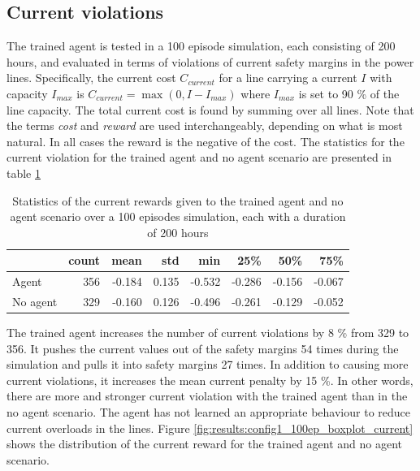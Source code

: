 \documentclass[class=book, crop=false]{standalone}
\begin{document}
\subsection{Current violations}
The trained agent is tested in a 100 episode simulation, each consisting of 200 hours, and evaluated in terms of violations of current safety margins in the power lines. Specifically, the current cost $C_{current}$ for a line carrying a current $I$ with capacity $I_{max}$ is $C_{current} = \max(0,I - I_{max})$ where $I_{max}$ is set to 90 \% of the line capacity. The total current cost is found by summing over all lines. Note that the terms \textit{cost} and \textit{reward} are used interchangeably, depending on what is most natural. In all cases the reward is the negative of the cost. The statistics for the current violation for the trained agent and no agent scenario are presented in table \ref{table:results:configuration1_reward_100_episodes_current}

\begin{table}[ht]
\center
\begin{tabular}{l|rrrrrrr}
         & count & mean   & std   & min    & 25\%   & 50\%   & 75\%   \\
\hline
Agent    & 356 & -0.184 & 0.135 & -0.532 & -0.286 & -0.156 & -0.067 \\
No agent & 329 & -0.160 & 0.126 & -0.496 & -0.261 & -0.129 & -0.052 \\
\hline
\end{tabular}
\caption{Statistics of the current rewards given to the trained agent and no agent scenario over a 100 episodes simulation, each with a duration of 200 hours}
\label{table:results:configuration1_reward_100_episodes_current}
\end{table}
The trained agent increases the number of current violations by 8 \% from 329 to 356. It pushes the current values out of the safety margins 54 times during the simulation and pulls it into safety margins 27 times. In addition to causing more current violations, it increases the mean current penalty by 15 \%. In other words, there are more and stronger current violation with the trained agent than in the no agent scenario. The agent has not learned an appropriate behaviour to reduce current overloads in the lines. Figure \ref{fig:results:config1_100ep_boxplot_current} shows the distribution of the current reward for the trained agent and no agent scenario. 
\end{document}
